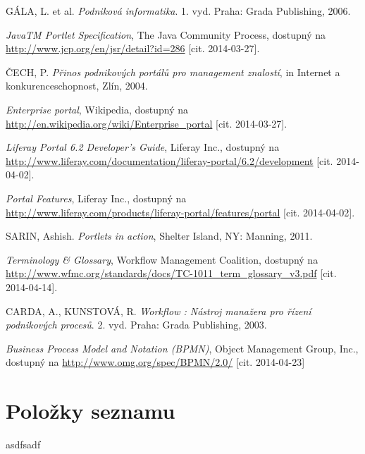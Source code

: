\documentclass{fithesis}
\begin{document}
\begin{thebibliography}{0}

GÁLA, L. et al. \textit{Podniková informatika}. 1. vyd. Praha: Grada Publishing, 2006. 

\textit{JavaTM Portlet Specification}, The Java Community Process, dostupný na \url{http://www.jcp.org/en/jsr/detail?id=286} [cit. 2014-03-27].

ČECH, P. \textit {Přinos podnikových portálů pro management znalostí}, in Internet a konkurenceschopnost, Zlín, 2004.

\textit{Enterprise portal}, Wikipedia, dostupný na \url{http://en.wikipedia.org/wiki/Enterprise_portal} [cit. 2014-03-27].

\textit{Liferay Portal 6.2 Developer's Guide}, Liferay Inc., dostupný na \url{http://www.liferay.com/documentation/liferay-portal/6.2/development} [cit. 2014-04-02].

\textit{Portal Features}, Liferay Inc., dostupný na \url{http://www.liferay.com/products/liferay-portal/features/portal} [cit. 2014-04-02].

SARIN, Ashish. \textit{Portlets in action}, Shelter Island, NY: Manning, 2011.

\textit{Terminology \& Glossary}, Workflow Management Coalition, dostupný na \url{http://www.wfmc.org/standards/docs/TC-1011_term_glossary_v3.pdf} [cit. 2014-04-14].

CARDA, A., KUNSTOVÁ, R. \textit {Workflow : Nástroj manažera pro řízení podnikových procesů}. 2. vyd. Praha: Grada Publishing, 2003.

\cite{bpmn}
\textit{Business Process Model and Notation (BPMN)}, Object Management Group, Inc., dostupný na \url{http://www.omg.org/spec/BPMN/2.0/} [cit. 2014-04-23]


\end{thebibliography}


\newpage
\appendix
\chapter{Položky seznamu}
asdfsadf
\end{document}
